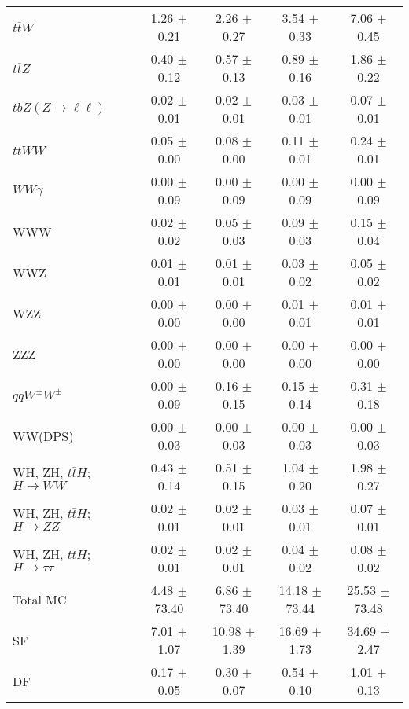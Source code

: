 \begin{tabular}{l|cccc}
                   $t\overline{t}W$ &  1.26 $\pm$  0.21 &  2.26 $\pm$  0.27 &  3.54 $\pm$  0.33 &  7.06 $\pm$  0.45 \\
                   $t\overline{t}Z$ &  0.40 $\pm$  0.12 &  0.57 $\pm$  0.13 &  0.89 $\pm$  0.16 &  1.86 $\pm$  0.22 \\
    $tbZ (Z \rightarrow \ell \ell)$ &  0.02 $\pm$  0.01 &  0.02 $\pm$  0.01 &  0.03 $\pm$  0.01 &  0.07 $\pm$  0.01 \\
                  $t\overline{t}WW$ &  0.05 $\pm$  0.00 &  0.08 $\pm$  0.00 &  0.11 $\pm$  0.01 &  0.24 $\pm$  0.01 \\
                         $WW\gamma$ &  0.00 $\pm$  0.09 &  0.00 $\pm$  0.09 &  0.00 $\pm$  0.09 &  0.00 $\pm$  0.09 \\
                                WWW &  0.02 $\pm$  0.02 &  0.05 $\pm$  0.03 &  0.09 $\pm$  0.03 &  0.15 $\pm$  0.04 \\
                                WWZ &  0.01 $\pm$  0.01 &  0.01 $\pm$  0.01 &  0.03 $\pm$  0.02 &  0.05 $\pm$  0.02 \\
                                WZZ &  0.00 $\pm$  0.00 &  0.00 $\pm$  0.00 &  0.01 $\pm$  0.01 &  0.01 $\pm$  0.01 \\
                                ZZZ &  0.00 $\pm$  0.00 &  0.00 $\pm$  0.00 &  0.00 $\pm$  0.00 &  0.00 $\pm$  0.00 \\
                 $qqW^{\pm}W^{\pm}$ &  0.00 $\pm$  0.09 &  0.16 $\pm$  0.15 &  0.15 $\pm$  0.14 &  0.31 $\pm$  0.18 \\
                            WW(DPS) &  0.00 $\pm$  0.03 &  0.00 $\pm$  0.03 &  0.00 $\pm$  0.03 &  0.00 $\pm$  0.03 \\
WH, ZH, $t\bar{t}H$; $H \rightarrow WW$ &  0.43 $\pm$  0.14 &  0.51 $\pm$  0.15 &  1.04 $\pm$  0.20 &  1.98 $\pm$  0.27 \\
WH, ZH, $t\bar{t}H$; $H \rightarrow ZZ$ &  0.02 $\pm$  0.01 &  0.02 $\pm$  0.01 &  0.03 $\pm$  0.01 &  0.07 $\pm$  0.01 \\
WH, ZH, $t\bar{t}H$; $H \rightarrow \tau\tau$ &  0.02 $\pm$  0.01 &  0.02 $\pm$  0.01 &  0.04 $\pm$  0.02 &  0.08 $\pm$  0.02 \\
\hline\hline
                           Total MC &  4.48 $\pm$ 73.40 &  6.86 $\pm$ 73.40 & 14.18 $\pm$ 73.44 & 25.53 $\pm$ 73.48 \\
\hline
                                 SF &  7.01 $\pm$  1.07 & 10.98 $\pm$  1.39 & 16.69 $\pm$  1.73 & 34.69 $\pm$  2.47 \\
                                 DF &  0.17 $\pm$  0.05 &  0.30 $\pm$  0.07 &  0.54 $\pm$  0.10 &  1.01 $\pm$  0.13 \\

\end{tabular}
